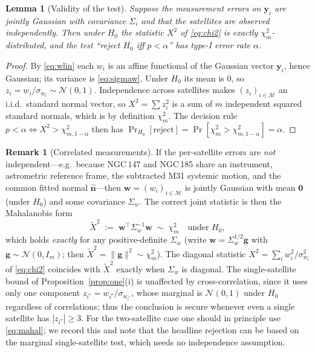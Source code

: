 \documentclass{amsart}
\newtheorem{lemma}{Lemma}
\theoremstyle{definition}
\newtheorem{remark}{Remark}
\begin{document}
\begin{lemma}[Validity of the test]\label{lem:valid}
Suppose the measurement errors on $\bm y_i$ are jointly Gaussian with
covariance $\Sigma_i$ and that the satellites are observed independently.
Then under $H_0$ the statistic $X^2$ of \eqref{eq:chi2} is exactly
$\chi^2_m$-distributed, and the test ``reject $H_0$ iff $p<\alpha$'' has
type-I error rate $\alpha$.
\end{lemma}
\begin{proof}
By \eqref{eq:wlin} each $w_i$ is an affine functional of the Gaussian vector
$\bm y_i$, hence Gaussian; its variance is \eqref{eq:sigmaw}. Under $H_0$
its mean is $0$, so $z_i=w_i/\sigma_{w_i}\sim\mathcal N(0,1)$. Independence
across satellites makes $(z_i)_{i\in\mathcal M}$ an i.i.d.\ standard normal
vector, so $X^2=\sum z_i^2$ is a sum of $m$ independent squared standard
normals, which is by definition $\chi^2_m$. The decision rule
$p<\alpha\Leftrightarrow X^2>\chi^2_{m,1-\alpha}$ then has
$\Pr_{H_0}[\text{reject}]=\Pr[\chi^2_m>\chi^2_{m,1-\alpha}]=\alpha$.
\end{proof}

\begin{remark}[Correlated measurements]\label{rem:corr}
If the per-satellite errors are \emph{not} independent---e.g.\ because
NGC\,147 and NGC\,185 share an instrument, astrometric reference frame, the
subtracted M31 systemic motion, and the common fitted normal $\hat{\bm n}$---then
$\bm w=(w_i)_{i\in\mathcal M}$ is jointly Gaussian with mean $\bm0$ (under
$H_0$) and some covariance $\Sigma_w$. The correct joint statistic is then the
Mahalanobis form
\begin{equation}\label{eq:mahal}
  \widetilde X^2 \;:=\; \bm w^{\!\top}\Sigma_w^{-1}\bm w \;\sim\; \chi^2_m
  \quad\text{under }H_0,
\end{equation}
which holds \emph{exactly} for any positive-definite $\Sigma_w$ (write
$\bm w=\Sigma_w^{1/2}\bm g$ with $\bm g\sim\mathcal N(0,I_m)$; then
$\widetilde X^2=\|\bm g\|^2\sim\chi^2_m$). The diagonal statistic
$X^2=\sum_i w_i^2/\sigma_{w_i}^2$ of \eqref{eq:chi2} coincides with
$\widetilde X^2$ exactly when $\Sigma_w$ is diagonal. The single-satellite
bound of Proposition~\ref{prop:one}(i) is unaffected by cross-correlation,
since it uses only one component $z_{i^\star}=w_{i^\star}/\sigma_{w_{i^\star}}$,
whose marginal is $\mathcal N(0,1)$ under $H_0$ regardless of correlations;
thus the conclusion is secure whenever even a single satellite has
$|z_{i^\star}|\ge 3$. For the two-satellite case one should in principle use
\eqref{eq:mahal}; we record this and note that the headline rejection can be
based on the marginal single-satellite test, which needs no independence
assumption.
\end{remark}
\end{document}

